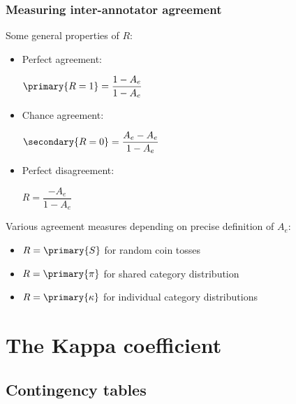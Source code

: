 \documentclass[t]{beamer} %
\begin{document}
\begin{frame}
  \frametitle{Measuring inter-annotator agreement}

  Some general properties of $R$:
  \begin{itemize}
  \item<2-> \parbox{4cm}{Perfect agreement:} $\primary{R = 1} = \dfrac{1 - A_e}{1 - A_e}$
  \item<3-> \parbox{4cm}{Chance agreement:} $\secondary{R = 0} = \dfrac{A_e - A_e}{1 - A_e}$
  \item<4-> \parbox{4cm}{Perfect disagreement:} $R = \dfrac{-A_e}{1 - A_e}$
  \end{itemize}

  \gap[2]
  Various agreement measures depending on precise definition of $A_e$:%
  \begin{itemize}
  \item<6-> $R = \primary{S}$ for random coin tosses \citep{Bennett:Alpert:Goldstein:54}
  \item<7-> $R = \primary{\pi}$ for shared category distribution \citep{Scott:55}
  \item<8-> $R = \primary{\kappa}$ for individual category distributions \citep{Cohen:60}
  \end{itemize}
\end{frame}


\section[Kappa]{The Kappa coefficient}

\subsection{Contingency tables}
\end{document}

